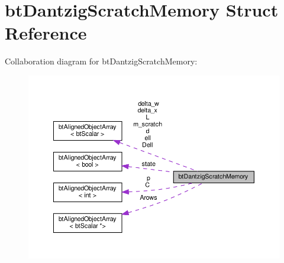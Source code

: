 \hypertarget{structbtDantzigScratchMemory}{}\section{bt\+Dantzig\+Scratch\+Memory Struct Reference}
\label{structbtDantzigScratchMemory}


Collaboration diagram for bt\+Dantzig\+Scratch\+Memory\+:
\nopagebreak
\begin{figure}[H]
\begin{center}
\leavevmode
\includegraphics[width=350pt]{structbtDantzigScratchMemory__coll__graph}
\end{center}
\end{figure}
